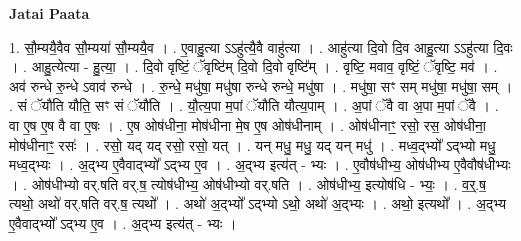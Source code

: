\documentclass[17pt]{extarticle}
\begin{document}
\textbf{Jatai Paata} \newline

1. सौ॒म्ययै॒वैव सौ॒म्यया॑ सौ॒म्ययै॒व । . ए॒वाहु॒त्या ऽऽहु॑त्यै॒वै वाहु॑त्या । . आहु॑त्या दि॒वो दि॒व आहु॒त्या ऽऽहु॑त्या दि॒वः । . आहु॒त्येत्या - हु॒त्या॒ । . दि॒वो वृष्टिं॒ ॅवृष्टि॑म् दि॒वो दि॒वो वृष्टि᳚म् । . वृष्टि॒ मवाव॒ वृष्टिं॒ ॅवृष्टि॒ मव॑ । . अव॑ रुन्धे रु॒न्धे ऽवाव॑ रुन्धे । . रु॒न्धे॒ मधु॑षा॒ मधु॑षा रुन्धे रुन्धे॒ मधु॑षा । . मधु॑षा॒ सꣳ सम् मधु॑षा॒ मधु॑षा॒ सम् । . सं ॅयौ॑ति यौति॒ सꣳ सं ॅयौ॑ति । . यौ॒त्य॒पा म॒पां ॅयौ॑ति यौत्य॒पाम् । . अ॒पां ॅवै वा अ॒पा म॒पां ॅवै । . वा ए॒ष ए॒ष वै वा ए॒षः । . ए॒ष ओष॑धीना॒ मोष॑धीना मे॒ष ए॒ष ओष॑धीनाम् । . ओष॑धीनाꣳ॒॒ रसो॒ रस॒ ओष॑धीना॒ मोष॑धीनाꣳ॒॒ रसः॑ । . रसो॒ यद् यद् रसो॒ रसो॒ यत् । . यन् मधु॒ मधु॒ यद् यन् मधु॑ । . मध्व॒द्भ्यो᳚ ऽद्भ्यो मधु॒ मध्व॒द्भ्यः । . अ॒द्भ्य ए॒वैवाद्भ्यो᳚ ऽद्भ्य ए॒व । . अ॒द्भ्य इत्य॑त् - भ्यः । . ए॒वौष॑धीभ्य॒ ओष॑धीभ्य ए॒वैवौष॑धीभ्यः । . ओष॑धीभ्यो वर्.षति वर्.ष॒ त्योष॑धीभ्य॒ ओष॑धीभ्यो वर्.षति । . ओष॑धीभ्य॒ इत्योष॑धि - भ्यः॒ । . व॒र्॒.ष॒ त्यथो॒ अथो॑ वर्.षति वर्.ष॒ त्यथो᳚ । . अथो॑ अ॒द्भ्यो᳚ ऽद्भ्यो ऽथो॒ अथो॑ अ॒द्भ्यः । . अथो॒ इत्यथो᳚ । . अ॒द्भ्य ए॒वैवाद्भ्यो᳚ ऽद्भ्य ए॒व । . अ॒द्भ्य इत्य॑त् - भ्यः । \newline
\end{document}
